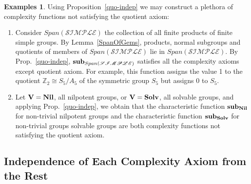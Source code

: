 \documentclass[a4paper,11pt]{amsart}
\theoremstyle{definition}
\newtheorem{examples}{Examples}
\newcommand{\Solv}{{\bf Solv}}
\newcommand{\Nil}{{\bf Nil}}
\newcommand{\Z}{\mathbb{Z}}
\newcommand{\1}{{\mathbf 1}}
\newcommand{\SIMPLE}{{\mathscr{SIMPLE}}}
\newcommand{\subS}{{\bf sub}}
\newcommand{\V}{{\bf V}}
\newcommand{\Span}{Span}
\begin{document}
\begin{examples}
Using Proposition~\ref{quo-indep} we may construct a plethora of  complexity functions not satisfying the quotient axiom:
\begin{enumerate}
\item Consider  $\Span(\SIMPLE)$  the collection of all finite products of finite simple groups.
 By Lemma~\ref{SpanOfGems}, products, normal subgroups and quotients of members of  $\Span(\SIMPLE)$ lie in $\Span(\SIMPLE)$.  
By Prop.~\ref{quo-indep},  $\subS_{\Span(\SIMPLE)}$ satisfies all the complexity axioms except quotient axiom.
For example, this function assigns the value 1 to the quotient $\Z_2\cong S_5/A_5$ of the symmetric group $S_5$  but
assigns $0$ to $S_5$.
\item Let $\V=\Nil$, all nilpotent groups, or $\V=\Solv$, all solvable groups, and applying Prop.~\ref{quo-indep}, we obtain
that the characteristic function $\subS_{\Nil}$ for non-trivial nilpotent groups and the characteristic function $\subS_{\Solv}$  for non-trivial groups solvable groups are both complexity functions not satisfying the quotient axiom. 
\end{enumerate}
\end{examples} 


\subsection{Independence of Each Complexity Axiom from the Rest}

  
\end{document}
